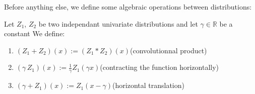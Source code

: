 \documentclass{article}
\begin{document}
Before anything else, we define some algebraic operations between distributions:
\begin{defn}
\label{def:algebraic operations on distributions}
Let $Z_1$, $Z_2$ be two independant univariate distributions and let $\gamma \in \mathbb{R}$ be a constant 
We define:
\begin{enumerate}
    \item $(Z_1+Z_2)(x) := (Z_1 * Z_2)(x)$\quad(convolutionnal product)
    \item $(\gamma \, Z_1)(x) := \frac{1}{\gamma}Z_1(\gamma x) $\quad(contracting the function horizontally)
    \item $(\gamma + Z_1)(x) := Z_1(x - \gamma)$\quad(horizontal translation)
\end{enumerate}
\end{defn}
\end{document}

